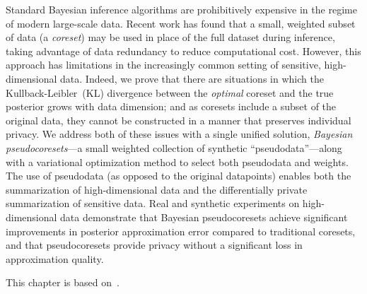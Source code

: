 {
Standard Bayesian inference algorithms are prohibitively expensive in the
regime of modern large-scale data. Recent work has found that
a small, weighted subset of data (a \emph{coreset}) may be used in place
of the full dataset during inference, taking advantage of data redundancy to
reduce computational cost. However, this approach has limitations 
in the increasingly common setting of sensitive, high-dimensional data. 
Indeed, we prove that there are situations in which 
the Kullback-Leibler~(KL) divergence between the \emph{optimal} coreset 
and the true posterior grows with data dimension; and as coresets include
a subset of the original data, they cannot be constructed in a manner
that preserves individual privacy.
We address both of these issues with a single unified solution, \emph{Bayesian
pseudocoresets}---a small weighted collection of synthetic
``pseudodata''---along with a variational optimization method to select both
pseudodata and weights.  The use of pseudodata (as opposed to
the original datapoints) enables both the summarization of high-dimensional data
and the  differentially private summarization of
sensitive data. Real and
synthetic experiments on high-dimensional data demonstrate that Bayesian 
pseudocoresets achieve significant improvements in posterior approximation error compared to
traditional coresets, and that pseudocoresets provide privacy without
a significant loss in approximation quality. 
}

This chapter is based on~\citep{psvi}.
